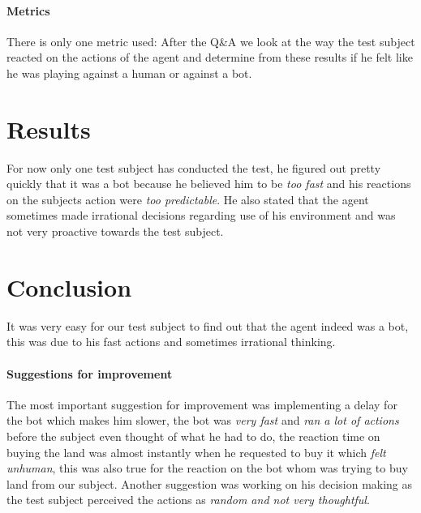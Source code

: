 \paragraph{Metrics}

There is only one metric used: After the Q\&A we look at the way the test subject reacted on the actions of the agent and determine from these results if he felt like he was playing against a human or against a bot. 

\section*{Results}

For now only one test subject has conducted the test, he figured out pretty quickly that it was a bot because he believed him to be \textit{too fast} and his reactions on the subjects action were \textit{too predictable}. He also stated that the agent sometimes made irrational decisions regarding use of his environment and was not very proactive towards the test subject.


\section*{Conclusion}

It was very easy for our test subject to find out that the agent indeed was a bot, this was due to his fast actions and sometimes irrational thinking.

\paragraph{Suggestions for improvement}

The most important suggestion for improvement was implementing a delay for the bot which makes him slower, the bot was \textit{very fast} and \textit{ran a lot of actions} before the subject even thought of what he had to do, the reaction time on buying the land was almost instantly when he requested to buy it which \textit{felt unhuman}, this was also true for the reaction on the bot whom was trying to buy land from our subject. Another suggestion was working on his decision making as the test subject perceived the actions as \textit{random and not very thoughtful}.

